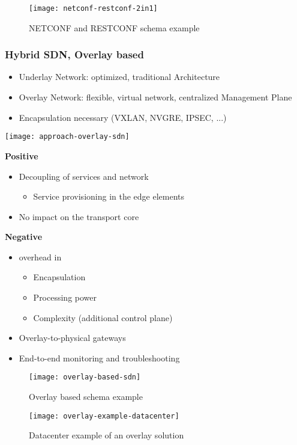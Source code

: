 \begin{figure}
	\centering
	\caption{NETCONF and RESTCONF schema example}
	\texttt{[image: netconf-restconf-2in1]}
\end{figure}

\subsubsection{Hybrid SDN, Overlay based}
\begin{itemize}
	\item Underlay Network: optimized, traditional Architecture 
	\item Overlay Network: flexible, virtual network, centralized Management Plane 
	\item Encapsulation necessary (VXLAN, NVGRE, IPSEC, ...) 
\end{itemize}

\texttt{[image: approach-overlay-sdn]}

\noindent
\textbf{Positive}
\begin{itemize}
	\item Decoupling of services and network 
		\begin{itemize}\item Service provisioning in the edge elements\end{itemize}
	\item No impact on the transport core  
\end{itemize}

\noindent
\textbf{Negative}
\begin{itemize}
	\item overhead in 
	\begin{itemize} \item Encapsulation \item Processing power \item Complexity (additional control plane) \end{itemize} 
	\item Overlay-to-physical gateways
	\item End-to-end monitoring and troubleshooting  
\end{itemize}

\begin{figure}
	\centering
	\caption{Overlay based schema example}
	\texttt{[image: overlay-based-sdn]}
\end{figure}

\begin{figure}
	\centering
	\texttt{[image: overlay-example-datacenter]}
	\caption{Datacenter example of an overlay solution}
\end{figure}